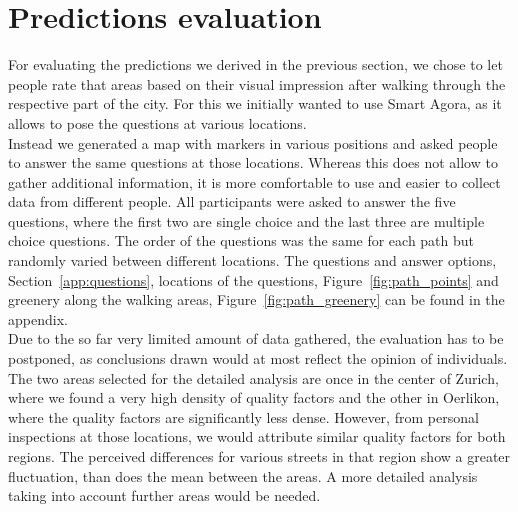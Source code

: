 \documentclass[letterpaper]{article}
\begin{document}
\section{Predictions evaluation}\label{sec:exp}
For evaluating the predictions we derived in the previous section, we chose to let people rate
that areas based on their visual impression after walking through the respective part of the city.
For this we initially wanted to use Smart Agora, as it allows to pose the questions at various locations.\\

\indent Instead we generated a map with markers in various positions and asked people to answer the same questions at those locations.
Whereas this does not allow to gather additional information, it is more comfortable to use and easier to collect data from
different people. All participants were asked to answer the five questions, where the first two are single choice
and the last three are multiple choice questions. The order of the questions was the same for each path but randomly varied
between different locations. The questions and answer options, Section~\ref{app:questions}, locations of the questions, Figure~\ref{fig:path_points}
and greenery along the walking areas, Figure~\ref{fig:path_greenery} can be found in the appendix.\\

\indent Due to the so far very limited amount of data gathered, the evaluation has to be postponed, as conclusions drawn would at most reflect the opinion of individuals. The two areas selected for the detailed analysis are once in the center of Zurich, where we found a very high density of quality factors and the other in Oerlikon, where the quality factors are significantly less dense. However, from personal inspections at those locations, we would attribute similar quality factors for both regions. The perceived differences for various streets in that region show a greater fluctuation, than does the mean between the areas. A more detailed analysis taking into account further areas would be needed.
\end{document}
